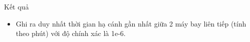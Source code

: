 Kết quả  
\begin{itemize}
	\item     Ghi ra duy nhất thời gian hạ cánh gần nhất giữa 2 máy bay liên tiếp (tính theo phút) với độ chính xác là 1e-6.   
\end{itemize}
